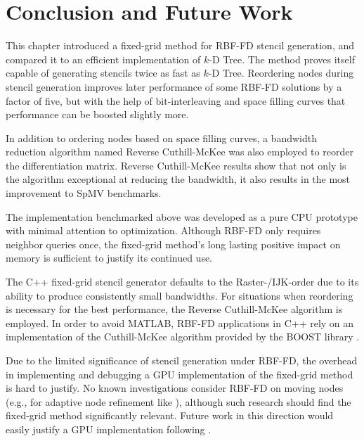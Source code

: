 \documentclass{report}
\begin{document}


\section{Conclusion and Future Work}

This chapter introduced a fixed-grid method for RBF-FD stencil generation, and compared it to an efficient implementation of $k$-D Tree. The method proves itself capable of generating stencils twice as fast as $k$-D Tree.  
Reordering nodes during stencil generation improves later performance of some RBF-FD solutions by a factor of five, but with the help of bit-interleaving and space filling curves that performance can be boosted slightly more.

In addition to ordering nodes based on space filling curves, a bandwidth reduction algorithm named Reverse Cuthill-McKee was also employed to reorder the differentiation matrix. Reverse Cuthill-McKee results show that not only is the algorithm exceptional at reducing the bandwidth, it also results in the most improvement to SpMV benchmarks. 

The implementation benchmarked above was developed as a pure CPU prototype with minimal attention to optimization. Although RBF-FD only requires neighbor queries once, the fixed-grid method's long lasting positive impact on memory is sufficient to justify its continued use. 

The C++ fixed-grid stencil generator defaults to the Raster-/IJK-order due to its ability to produce consistently small bandwidths. For situations when reordering is necessary for the best performance, the Reverse Cuthill-McKee algorithm is employed. In order to avoid MATLAB, RBF-FD applications in C++ rely on an implementation of the Cuthill-McKee algorithm provided by the BOOST library \cite{BoostSite}. 




Due to the limited significance of stencil generation under RBF-FD, the overhead in implementing and debugging a GPU implementation of the fixed-grid method is hard to justify. No known investigations consider RBF-FD on moving nodes (e.g., for adaptive node refinement like \cite{FlyerLehto10}), although such research should find the fixed-grid method significantly relevant. Future work in this direction would easily justify a GPU implementation following \cite{Krog2010,Green2010,Johnson2011, Goswami2010}. 
\end{document}
